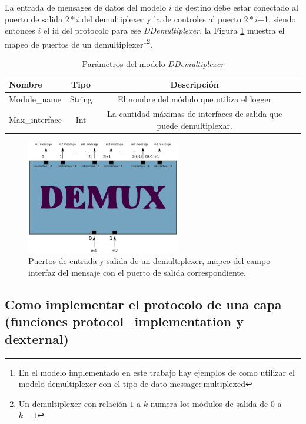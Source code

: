 \documentclass[10pt,a4paper]{article}
\begin{document}
La entrada de mensages de datos del modelo $i$ de destino debe estar conectado al puerto de salida $2*i$ del demultiplexer y la de controles al puerto $2*i$+1, siendo entonces $i$ el id del protocolo para ese \textit{DDemultiplexer}, la Figura \ref{figure: demultiplexer} muestra el mapeo de puertos de un demultiplexer\footnote{En el modelo implementado en este trabajo hay ejemplos de como utilizar el modelo demultiplexer con el tipo de dato message::multiplexed}\footnote{Un demultiplexer con relación $1$ a $k$ numera los módulos de salida de $0$ a $k-1$}. \\

\begin{table}[!hbt]
	\begin{tabular}{|l|c|c|c|}
  		\hline
  		\textbf{Nombre} & \textbf{Tipo} & \textbf{Descripción} \\
  		\hline
  		Module\_name & String & El nombre del módulo que utiliza el logger \\
  		\hline
  		Max\_interface & Int & La cantidad máximas de interfaces de salida que puede demultiplexar. \\
  		\hline
	\end{tabular}
	\caption{Parámetros del modelo \textit{DDemultiplexer}}
	\label{table: parameter ddemultiplexer}
\end{table}

\begin{figure}[!hbt]
    \centering
    \includegraphics[width = 0.6\textwidth]{img/png/demultiplexer.png}
    \caption{Puertos de entrada y salida de un demultiplexer, mapeo del campo interfaz del mensaje con el puerto de salida correspondiente.}
    \label{figure: demultiplexer}
\end{figure}

\newpage

\subsection{Como implementar el protocolo de una capa (funciones protocol\_implementation y dexternal)}
\end{document}
